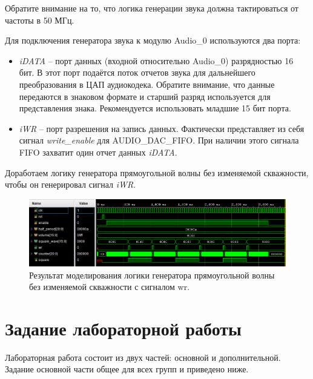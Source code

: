 Обратите внимание на то, что логика генерации звука должна тактироваться от частоты в 50 МГц.



Для подключения генератора звука к модулю Audio\_0 используются два порта:
\begin{itemize}
	\item \textit{iDATA} -- порт данных (входной относительно Audio\_0) разрядностью 16 бит. В этот порт подаётся поток отчетов звука для дальнейшего преобразования в ЦАП аудиокодека. Обратите внимание, что данные передаются в знаковом формате и старший разряд используется для представления знака. Рекомендуется использовать младшие 15 бит порта.
	\item \textit{iWR} -- порт разрешения на запись данных. Фактически представляет из себя сигнал \textit{write\_enable} для AUDIO\_DAC\_FIFO. При наличии этого сигнала FIFO захватит один отчет данных \textit{iDATA}.

\end{itemize}


Доработаем логику генератора прямоугольной волны без изменяемой скважности, чтобы он генерировал сигнал \textit{iWR}.


	


\begin{figure}[H]
	\centering
	\includegraphics [width=1\textwidth] {images/lab_7/square_simulate3.png}
	\caption{Результат моделирования логики генератора прямоугольной волны без изменяемой скважности с сигналом wr.}
	\label{lab7:pic7}
\end{figure}

\section{Задание лабораторной работы}

Лабораторная работа состоит из двух частей: основной и дополнительной. Задание основной части общее для всех групп и приведено ниже.

